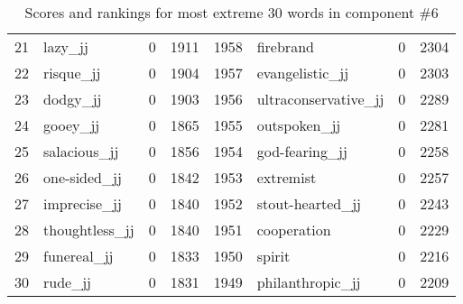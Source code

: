 \begin{table}[tbp]
\begin{tabular}{| rlr@{.}l | rlr@{.}l |}
    21 & lazy\_jj & 0 & 1911    &    1958 & firebrand & 0 & 2304 \\
    22 & risque\_jj & 0 & 1904    &    1957 & evangelistic\_jj & 0 & 2303 \\
    23 & dodgy\_jj & 0 & 1903    &    1956 & ultraconservative\_jj & 0 & 2289 \\
    24 & gooey\_jj & 0 & 1865    &    1955 & outspoken\_jj & 0 & 2281 \\
    25 & salacious\_jj & 0 & 1856    &    1954 & god-fearing\_jj & 0 & 2258 \\
    26 & one-sided\_jj & 0 & 1842    &    1953 & extremist & 0 & 2257 \\
    27 & imprecise\_jj & 0 & 1840    &    1952 & stout-hearted\_jj & 0 & 2243 \\
    28 & thoughtless\_jj & 0 & 1840    &    1951 & cooperation & 0 & 2229 \\
    29 & funereal\_jj & 0 & 1833    &    1950 & spirit & 0 & 2216 \\
    30 & rude\_jj & 0 & 1831    &    1949 & philanthropic\_jj & 0 & 2209 \\
    \hline
    \end{tabular}
    \caption{Scores and rankings for most extreme 30 words in component \#6} 
\end{table}
\clearpage
